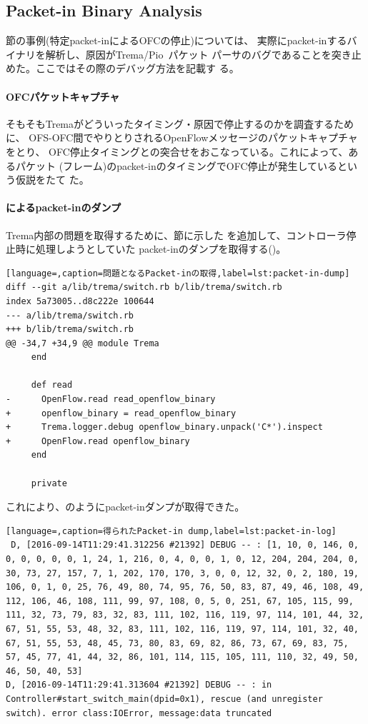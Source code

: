   \subsection{Packet-in Binary Analysis}
  \label{sec:trema-packet-in-analysis}

\label{sec:trema-logger}節の事例(特定packet-inによるOFCの停止)については、
実際にpacket-inするバイナリを解析し、原因がTrema/Pio~\cite{pio}パケット
パーサのバグであることを突き止めた。ここではその際のデバッグ方法を記載す
る。

    \paragraph{OFCパケットキャプチャ}
そもそもTremaがどういったタイミング・原因で停止するのかを調査するために、
OFS-OFC間でやりとりされるOpenFlowメッセージのパケットキャプチャをとり、
OFC停止タイミングとの突合せをおこなっている。これによって、あるパケット
(フレーム)のpacket-inのタイミングでOFC停止が発生しているという仮説をたて
た。

    \paragraph{によるpacket-inのダンプ}
Trema内部の問題を取得するために、\label{sec:trema-logger}節に示した
を追加して、コントローラ停止時に処理しようとしていた
packet-inのダンプを取得する()。
\begin{lstlisting}[language=,caption=問題となるPacket-inの取得,label=lst:packet-in-dump]
diff --git a/lib/trema/switch.rb b/lib/trema/switch.rb
index 5a73005..d8c222e 100644
--- a/lib/trema/switch.rb
+++ b/lib/trema/switch.rb
@@ -34,7 +34,9 @@ module Trema
     end

     def read
-      OpenFlow.read read_openflow_binary
+      openflow_binary = read_openflow_binary
+      Trema.logger.debug openflow_binary.unpack('C*').inspect
+      OpenFlow.read openflow_binary
     end

     private
\end{lstlisting}

これにより、のようにpacket-inダンプが取得できた。
\begin{lstlisting}[language=,caption=得られたPacket-in dump,label=lst:packet-in-log]
 D, [2016-09-14T11:29:41.312256 #21392] DEBUG -- : [1, 10, 0, 146, 0, 0, 0, 0, 0, 0, 1, 24, 1, 216, 0, 4, 0, 0, 1, 0, 12, 204, 204, 204, 0, 30, 73, 27, 157, 7, 1, 202, 170, 170, 3, 0, 0, 12, 32, 0, 2, 180, 19, 106, 0, 1, 0, 25, 76, 49, 80, 74, 95, 76, 50, 83, 87, 49, 46, 108, 49, 112, 106, 46, 108, 111, 99, 97, 108, 0, 5, 0, 251, 67, 105, 115, 99, 111, 32, 73, 79, 83, 32, 83, 111, 102, 116, 119, 97, 114, 101, 44, 32, 67, 51, 55, 53, 48, 32, 83, 111, 102, 116, 119, 97, 114, 101, 32, 40, 67, 51, 55, 53, 48, 45, 73, 80, 83, 69, 82, 86, 73, 67, 69, 83, 75, 57, 45, 77, 41, 44, 32, 86, 101, 114, 115, 105, 111, 110, 32, 49, 50, 46, 50, 40, 53]
D, [2016-09-14T11:29:41.313604 #21392] DEBUG -- : in Controller#start_switch_main(dpid=0x1), rescue (and unregister switch). error class:IOError, message:data truncated
\end{lstlisting}

